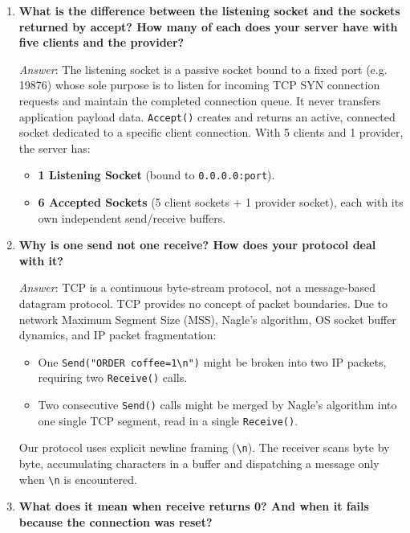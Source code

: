 \documentclass[11pt,a4paper]{article}
\begin{document}
\begin{enumerate}[label=\textbf{Control Q\arabic*.},leftmargin=*]
    \item \textbf{What is the difference between the listening socket and the sockets returned by accept? How many of each does your server have with five clients and the provider?}
    
    \textit{Answer}: The listening socket is a passive socket bound to a fixed port (e.g. 19876) whose sole purpose is to listen for incoming TCP SYN connection requests and maintain the completed connection queue. It never transfers application payload data. \texttt{Accept()} creates and returns an active, connected socket dedicated to a specific client connection. With 5 clients and 1 provider, the server has:
    \begin{itemize}
        \item \textbf{1 Listening Socket} (bound to \texttt{0.0.0.0:port}).
        \item \textbf{6 Accepted Sockets} (5 client sockets + 1 provider socket), each with its own independent send/receive buffers.
    \end{itemize}

    \item \textbf{Why is one send not one receive? How does your protocol deal with it?}
    
    \textit{Answer}: TCP is a continuous byte-stream protocol, not a message-based datagram protocol. TCP provides no concept of packet boundaries. Due to network Maximum Segment Size (MSS), Nagle's algorithm, OS socket buffer dynamics, and IP packet fragmentation:
    \begin{itemize}
        \item One \texttt{Send("ORDER coffee=1\textbackslash n")} might be broken into two IP packets, requiring two \texttt{Receive()} calls.
        \item Two consecutive \texttt{Send()} calls might be merged by Nagle's algorithm into one single TCP segment, read in a single \texttt{Receive()}.
    \end{itemize}
    Our protocol uses explicit newline framing (\texttt{\textbackslash n}). The receiver scans byte by byte, accumulating characters in a buffer and dispatching a message only when \texttt{\textbackslash n} is encountered.

    \item \textbf{What does it mean when receive returns 0? And when it fails because the connection was reset?}
    

\end{enumerate}
\end{document}
